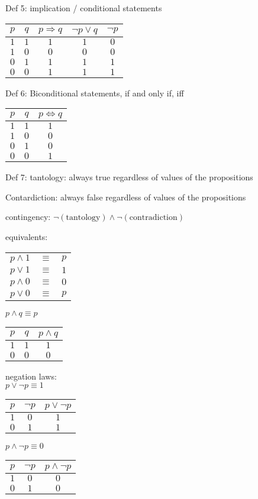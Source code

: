 \documentclass{article}
\begin{document}
Def 5: implication / conditional statements \\
\begin{tabular}{cc|c||c||c}
  $p$ & $q$ & $p \Rightarrow q$ & $\neg p \vee q$ & $\neg p$ \\ \hline
  $1$ & $1$ & $1$ & $1$ & $0$ \\
  $1$ & $0$ & $0$ & $0$ & $0$ \\
  $0$ & $1$ & $1$ & $1$ & $1$ \\
  $0$ & $0$ & $1$ & $1$ & $1$
\end{tabular}

Def 6: Biconditional statements, if and only if, iff\\
\begin{tabular}{cc|c}
  $p$ & $q$ & $p \Leftrightarrow q$ \\ \hline
  $1$ & $1$ & $1$ \\
  $1$ & $0$ & $0$ \\
  $0$ & $1$ & $0$ \\
  $0$ & $0$ & $1$
\end{tabular}

Def 7:
tantology: always true regardless of values of the propositions

Contardiction: always false regardless of values of the propositions

contingency: $\neg \left(\text{tantology}\right) \wedge \neg \left(\text{contradiction}\right)$

equivalents:\\
\begin{tabular}{ccc}
  $p \wedge 1$ & $\equiv$ & $p$ \\
  $p \vee 1$ & $\equiv$ & $1$ \\
  $p \wedge 0$ & $\equiv$ & $0$ \\
  $p \vee 0$ & $\equiv$ & $p$
\end{tabular}

$p \wedge q \equiv p$\\
\begin{tabular}{cc|c}
  $p$ & $q$ & $p \wedge q$ \\ \hline
  $1$ & $1$ & $1$ \\
  $0$ & $0$ & $0$ \\
\end{tabular}

negation laws:\\
$p \vee \neg p \equiv 1$ \\
\begin{tabular}{cc|c}
  $p$ & $\neg p$ & $p \vee \neg p$ \\ \hline
  $1$ & $0$ & $1$ \\
  $0$ & $1$ & $1$ \\
\end{tabular}

$p \wedge \neg p \equiv 0$ \\
\begin{tabular}{cc|c}
  $p$ & $\neg p$ & $p \wedge \neg p$ \\ \hline
  $1$ & $0$ & $0$ \\
  $0$ & $1$ & $0$ \\
\end{tabular}
\end{document}
